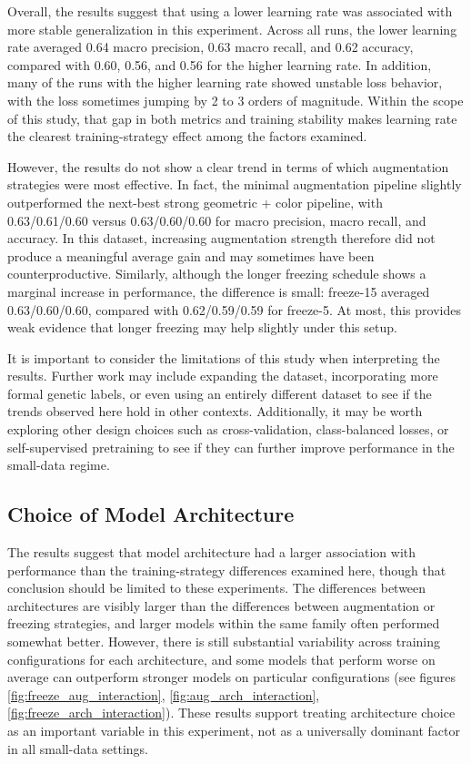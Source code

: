 \documentclass[conference]{IEEEtran}
\begin{document}
Overall, the results suggest that using a lower learning rate was associated with more stable generalization in this experiment. Across all runs, the lower learning rate averaged 0.64 macro precision, 0.63 macro recall, and 0.62 accuracy, compared with 0.60, 0.56, and 0.56 for the higher learning rate. In addition, many of the runs with the higher learning rate showed unstable loss behavior, with the loss sometimes jumping by 2 to 3 orders of magnitude. Within the scope of this study, that gap in both metrics and training stability makes learning rate the clearest training-strategy effect among the factors examined.

However, the results do not show a clear trend in terms of which augmentation strategies were most effective. In fact, the minimal augmentation pipeline slightly outperformed the next-best strong geometric + color pipeline, with 0.63/0.61/0.60 versus 0.63/0.60/0.60 for macro precision, macro recall, and accuracy. In this dataset, increasing augmentation strength therefore did not produce a meaningful average gain and may sometimes have been counterproductive. Similarly, although the longer freezing schedule shows a marginal increase in performance, the difference is small: freeze-15 averaged 0.63/0.60/0.60, compared with 0.62/0.59/0.59 for freeze-5. At most, this provides weak evidence that longer freezing may help slightly under this setup.

It is important to consider the limitations of this study when interpreting the results. Further work may include expanding the dataset, incorporating more formal genetic labels, or even using an entirely different dataset to see if the trends observed here hold in other contexts. Additionally, it may be worth exploring other design choices such as cross-validation, class-balanced losses, or self-supervised pretraining to see if they can further improve performance in the small-data regime.

\subsection{Choice of Model Architecture}

The results suggest that model architecture had a larger association with performance than the training-strategy differences examined here, though that conclusion should be limited to these experiments. The differences between architectures are visibly larger than the differences between augmentation or freezing strategies, and larger models within the same family often performed somewhat better. However, there is still substantial variability across training configurations for each architecture, and some models that perform worse on average can outperform stronger models on particular configurations (see figures \ref{fig:freeze_aug_interaction}, \ref{fig:aug_arch_interaction}, \ref{fig:freeze_arch_interaction}). These results support treating architecture choice as an important variable in this experiment, not as a universally dominant factor in all small-data settings.
\end{document}
